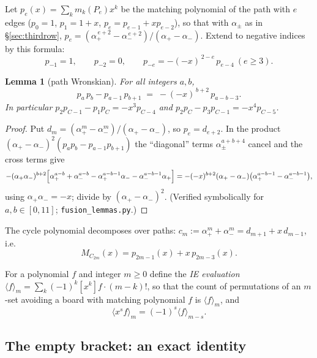 \documentclass[11pt]{article}
\newtheorem{lemma}[theorem]{Lemma}
\theoremstyle{definition}
\begin{document}
Let $p_e(x)=\sum_k m_k(P_e)x^k$ be the matching polynomial of the path
with $e$ edges ($p_0=1$, $p_1=1+x$, $p_e=p_{e-1}+xp_{e-2}$), so that with
$\alpha_\pm$ as in \S\ref{sec:thirdrow},
$p_e=(\alpha_+^{\,e+2}-\alpha_-^{\,e+2})/(\alpha_+-\alpha_-)$.
Extend to negative indices by this formula:
\[
p_{-1}=1,\qquad p_{-2}=0,\qquad
p_{-e}=-(-x)^{\,2-e}\,p_{e-4}\ (e\ge3).
\]

\begin{lemma}[path Wronskian]\label{lem:wronskian}
For all integers $a,b$,
\begin{equation}\label{eq:wronskian}
p_a\,p_b-p_{a-1}\,p_{b+1}\;=\;-(-x)^{\,b+2}\,p_{a-b-3}.
\end{equation}
In particular $p_2p_{C-1}-p_1p_C=-x^3p_{C-4}$ and
$p_2p_C-p_3p_{C-1}=-x^4p_{C-5}$.
\end{lemma}

\begin{proof}
Put $d_m=(\alpha_+^m-\alpha_-^m)/(\alpha_+-\alpha_-)$, so $p_e=d_{e+2}$.
In the product $(\alpha_+-\alpha_-)^2(p_ap_b-p_{a-1}p_{b+1})$ the
``diagonal'' terms $\alpha_\pm^{a+b+4}$ cancel and the cross terms give
\[
-(\alpha_+\alpha_-)^{b+2}\Bigl[\alpha_+^{a-b}+\alpha_-^{a-b}
-\alpha_+^{a-b-1}\alpha_--\alpha_-^{a-b-1}\alpha_+\Bigr]
=-(-x)^{b+2}(\alpha_+-\alpha_-)\bigl(\alpha_+^{a-b-1}-\alpha_-^{a-b-1}\bigr),
\]
using $\alpha_+\alpha_-=-x$; divide by $(\alpha_+-\alpha_-)^2$.
(Verified symbolically for $a,b\in[0,11]$; \texttt{fusion\_lemmas.py}.)
\end{proof}

The cycle polynomial decomposes over paths:
$c_m:=\alpha_+^m+\alpha_-^m=d_{m+1}+x\,d_{m-1}$, i.e.
\begin{equation}\label{eq:cycletopath}
M_{C_{2m}}(x)=p_{2m-1}(x)+x\,p_{2m-3}(x).
\end{equation}

For a polynomial $f$ and integer $m\ge0$ define the \emph{IE evaluation}
$\langle f\rangle_m=\sum_k(-1)^k[x^k]f\cdot(m-k)!$, so that the count of
permutations of an $m$-set avoiding a board with matching polynomial $f$
is $\langle f\rangle_m$, and
\begin{equation}\label{eq:shift}
\langle x^s f\rangle_m=(-1)^s\langle f\rangle_{m-s}.
\end{equation}

\subsection{The empty bracket: an exact identity}
\end{document}
